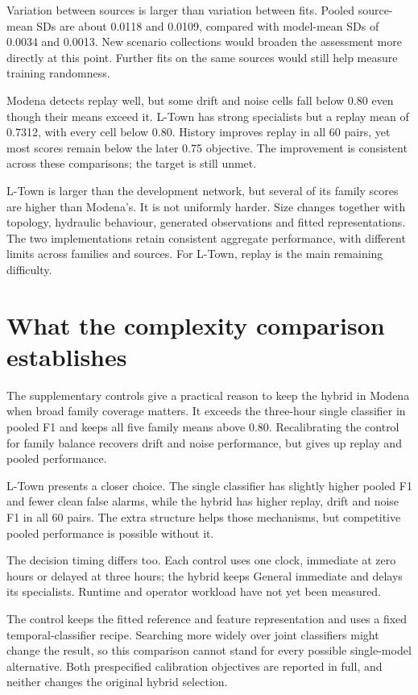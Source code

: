 Variation between sources is larger than variation between fits. Pooled source-mean SDs are about 0.0118 and 0.0109, compared with model-mean SDs of 0.0034 and 0.0013. New scenario collections would broaden the assessment more directly at this point. Further fits on the same sources would still help measure training randomness.

Modena detects replay well, but some drift and noise cells fall below 0.80 even though their means exceed it. L-Town has strong specialists but a replay mean of 0.7312, with every cell below 0.80. History improves replay in all 60 pairs, yet most scores remain below the later 0.75 objective. The improvement is consistent across these comparisons; the target is still unmet.

L-Town is larger than the development network, but several of its family scores are higher than Modena's. It is not uniformly harder. Size changes together with topology, hydraulic behaviour, generated observations and fitted representations. The two implementations retain consistent aggregate performance, with different limits across families and sources. For L-Town, replay is the main remaining difficulty.

\section{What the complexity comparison establishes}
The supplementary controls give a practical reason to keep the hybrid in Modena when broad family coverage matters. It exceeds the three-hour single classifier in pooled F1 and keeps all five family means above 0.80. Recalibrating the control for family balance recovers drift and noise performance, but gives up replay and pooled performance.

L-Town presents a closer choice. The single classifier has slightly higher pooled F1 and fewer clean false alarms, while the hybrid has higher replay, drift and noise F1 in all 60 pairs. The extra structure helps those mechanisms, but competitive pooled performance is possible without it.

The decision timing differs too. Each control uses one clock, immediate at zero hours or delayed at three hours; the hybrid keeps General immediate and delays its specialists. Runtime and operator workload have not yet been measured.

The control keeps the fitted reference and feature representation and uses a fixed temporal-classifier recipe. Searching more widely over joint classifiers might change the result, so this comparison cannot stand for every possible single-model alternative. Both prespecified calibration objectives are reported in full, and neither changes the original hybrid selection.

